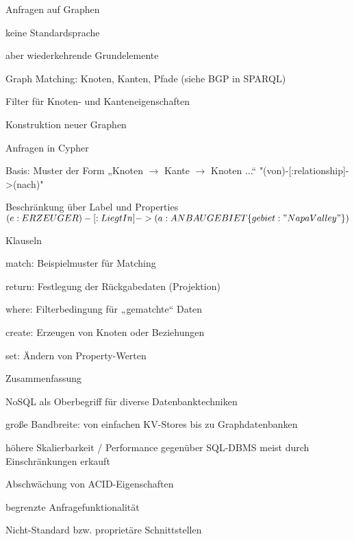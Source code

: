 \documentclass[a4paper]{article}
\begin{document}
\begin{multicols}{3}
\begin{itemize*}
    Anfragen auf Graphen
    \begin{itemize*}
        \item keine Standardsprache
        \item aber wiederkehrende Grundelemente
        \begin{itemize*}
            \item Graph Matching: Knoten, Kanten, Pfade (siehe BGP in SPARQL)
            \item Filter für Knoten- und Kanteneigenschaften
            \item Konstruktion neuer Graphen
        \end{itemize*}
        \item Anfragen in Cypher
        \begin{itemize*}
            \item Basis: Muster der Form „Knoten $\rightarrow$ Kante $\rightarrow$ Knoten ...“ "(von)-[:relationship]->(nach)"
            \item Beschränkung über Label und Properties $(e:ERZEUGER)-[:LiegtIn]->(a:ANBAUGEBIET \{gebiet: "Napa Valley"\} )$
        \end{itemize*}
        \item Klauseln
        \begin{itemize*}
            \item match: Beispielmuster für Matching
            \item return: Festlegung der Rückgabedaten (Projektion)
            \item where: Filterbedingung für „gematchte“ Daten
            \item create: Erzeugen von Knoten oder Beziehungen
            \item set: Ändern von Property-Werten
        \end{itemize*}
    \end{itemize*}
\end{itemize*}

Zusammenfassung
\begin{itemize*}
    \item NoSQL als Oberbegriff für diverse Datenbanktechniken
    \item große Bandbreite: von einfachen KV-Stores bis zu Graphdatenbanken
    \item höhere Skalierbarkeit / Performance gegenüber SQL-DBMS meist durch Einschränkungen erkauft
    \item Abschwächung von ACID-Eigenschaften
    \item begrenzte Anfragefunktionalität
    \item Nicht-Standard bzw. proprietäre Schnittstellen
\end{itemize*}


\end{multicols}
\end{document}

